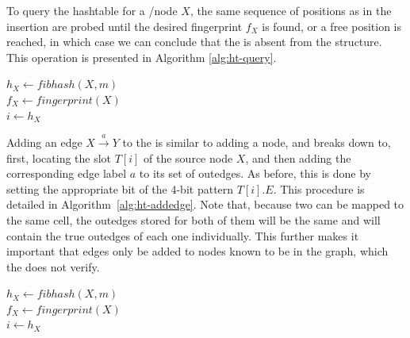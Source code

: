 To query the hashtable for a \kmer/node $X$, the same sequence of positions as in the insertion are probed until the desired fingerprint $f_X$ is found, or a free position is reached, in which case we can conclude that the \kmer is absent from the structure. This operation is presented in Algorithm \ref{alg:ht-query}.

\begin{algorithm}
	\caption{$T.\mathit{query}(X)$}\label{alg:ht-query}
	$h_X \gets \mathit{fibhash}(X, m)$\\
  $f_X \gets \mathit{fingerprint}(X)$\\
	$i \gets h_X$\\
  \Return{$\varnothing$}
\end{algorithm}


Adding an edge $X\stackrel{a}{\longrightarrow}Y$ to the \dBHT is similar to adding a \kmer node, and breaks down to, first, locating the slot $T[i]$ of the source node $X$, and then adding the corresponding edge label $a$ to its set of outedges. As before, this is done by setting the appropriate bit of the  4-bit pattern $T[i].E$. This procedure is detailed in Algorithm~\ref{alg:ht-addedge}. Note that, because two  can be mapped to the same cell, the outedges stored for both of them will be the same and will contain the true outedges of each one individually. This further makes it important that edges only be added to nodes known to be in the graph, which the \dBHT does not verify.


\begin{algorithm}
  \caption{$T.\mathit{add\_outedge}(X, a)$}\label{alg:ht-addedge}
  $h_X \gets \mathit{fibhash}(X, m)$\\
  $f_X \gets \mathit{fingerprint}(X)$\\
  $i \gets h_X$\\
\end{algorithm}


